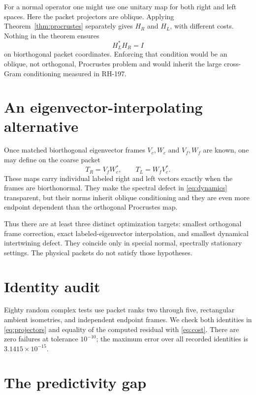 \documentclass[12pt]{article}
\theoremstyle{remark}\newtheorem{remark}[theorem]{Remark}
\begin{document}
For a normal operator one might use one unitary map for both right and left
spaces.  Here the packet projectors are oblique.  Applying
Theorem~\ref{thm:procrustes} separately gives $H_R$ and $H_L$, with different
costs.  Nothing in the theorem ensures
\begin{equation*}
 H_L^*H_R=I
\end{equation*}
on biorthogonal packet coordinates.  Enforcing that condition would be an
oblique, not orthogonal, Procrustes problem and would inherit the large
cross-Gram conditioning measured in RH-197.

\section{An eigenvector-interpolating alternative}

Once matched biorthogonal eigenvector frames $V_c,W_c$ and $V_f,W_f$ are
known, one may define on the coarse packet
\begin{equation}\label{eq:interpolating-map}
 T_R=V_fW_c^*,\qquad T_L=W_fV_c^*.
\end{equation}
These maps carry individual labeled right and left vectors exactly when the
frames are biorthonormal.  They make the spectral defect in
\eqref{eq:dynamics} transparent, but their norms inherit oblique
conditioning and they are even more endpoint dependent than the orthogonal
Procrustes map.

Thus there are at least three distinct optimization targets: smallest
orthogonal frame correction, exact labeled-eigenvector interpolation, and
smallest dynamical intertwining defect.  They coincide only in special
normal, spectrally stationary settings.  The physical packets do not satisfy
those hypotheses.

\section{Identity audit}

Eighty random complex tests use packet ranks two through five, rectangular
ambient isometries, and independent endpoint frames.  We check both
identities in \eqref{eq:projectors} and equality of the computed residual
with \eqref{eq:cost}.  There are zero failures at tolerance $10^{-10}$; the
maximum error over all recorded identities is $3.1415\times10^{-15}$.

\section{The predictivity gap}
\end{document}

